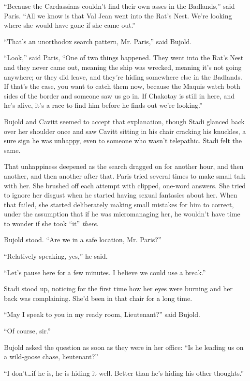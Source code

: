 \documentclass[twoside,letterpaper,12pt]{memoir}
\begin{document}
``Because the Cardassians couldn't find their own asses in the Badlands,'' said Paris. ``All we know is that Val Jean went into the Rat's Nest. We're looking where she would have gone if she came out.''

``That's an unorthodox search pattern, Mr. Paris,'' said Bujold.

``Look,'' said Paris, ``One of two things happened. They went into the Rat's Nest and they never came out, meaning the ship was wrecked, meaning it's not going anywhere; or they did leave, and they're hiding somewhere else in the Badlands. If that's the case, you want to catch them now, because the Maquis watch both sides of the border and someone saw us go in. If Chakotay is still in here, and he's alive, it's a race to find him before he finds out we're looking.''

Bujold and Cavitt seemed to accept that explanation, though Stadi glanced back over her shoulder once and saw Cavitt sitting in his chair cracking his knuckles, a sure sign he was unhappy, even to someone who wasn’t telepathic. Stadi felt the same.

That unhappiness deepened as the search dragged on for another hour, and then another, and then another after that. Paris tried several times to make small talk with her. She brushed off each attempt with clipped, one-word answers. She tried to ignore her disgust when he started having sexual fantasies about her. When that failed, she started deliberately making small mistakes for him to correct, under the assumption that if he was micromanaging her, he wouldn't have time to wonder if she took ``it'' \textit{there}.

Bujold stood. ``Are we in a safe location, Mr. Paris?''

``Relatively speaking, yes,'' he said.

``Let’s pause here for a few minutes. I believe we could use a break.''

Stadi stood up, noticing for the first time how her eyes were burning and her back was complaining. She’d been in that chair for a long time.

``May I speak to you in my ready room, Lieutenant?'' said Bujold.

``Of course, sir.''

Bujold asked the question as soon as they were in her office: ``Is he leading us on a wild-goose chase, lieutenant?''

``I don't\ldots if he is, he is hiding it well. Better than he's hiding his other thoughts.''
\end{document}

